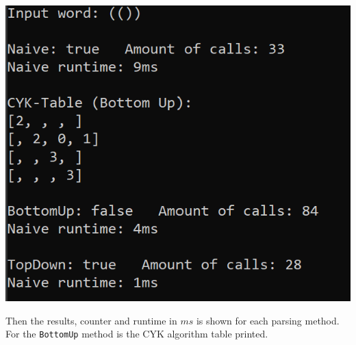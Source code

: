 \documentclass[a4paper, 11pt]{article}
\begin{document}
\begin{minipage}{0.4\textwidth}
\includegraphics[scale=0.6]{images/terminal_2.png}
\end{minipage}\begin{minipage}{0.6\textwidth}
Then the results, counter and runtime in $ms$ is shown for each parsing method. \\
For the \texttt{BottomUp} method is the CYK algorithm table printed.
\end{minipage}
















\fancyhead[LO]{\empty}




\newpage
{}
{}
\printbibliography
\end{document}
